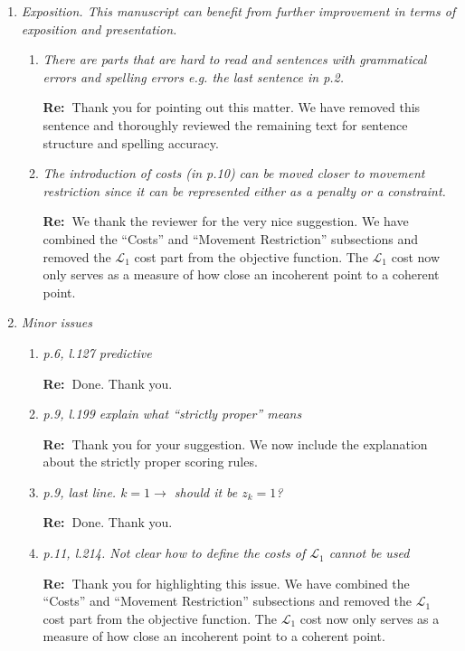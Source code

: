 \documentclass[11pt,a4paper]{article}
\newcommand{\RE}[2][Re:~]{{\color{blue}\textbf{#1}#2}}
\begin{document}
\begin{enumerate}
\item \textit{Exposition. This manuscript can benefit from further improvement in terms of exposition and presentation. }
\begin{enumerate}
    \item \textit{There are parts that are hard to read and sentences with grammatical errors and spelling errors e.g. the last sentence in p.2.}
    
    \RE{Thank you for pointing out this matter. We have removed this sentence and thoroughly reviewed the remaining text for sentence structure and spelling accuracy.}
    \item \textit{The introduction of costs (in p.10) can be moved closer to movement restriction since it can be represented either as a penalty or a constraint.}
    
    \RE{We thank the reviewer for the very nice suggestion. We have combined the ``Costs'' and ``Movement Restriction'' subsections and removed the $\mathcal{L}_1$ cost part from the objective function. The $\mathcal{L}_1$ cost now only serves as a measure of how close an incoherent point to a coherent point.}

\end{enumerate}




\item \textit{ Minor issues }

  \begin{enumerate}
    \item  \textit{p.6, l.127 predictive}

    \RE{Done. Thank you.}

    \item \textit{p.9, l.199 explain what ``strictly proper'' means}

    \RE{Thank you for your suggestion. We now include the explanation about the strictly proper scoring rules.}



    \item \textit{p.9, last line. $k = 1 \rightarrow$ should it be $z_k = 1$?}
    
    \RE{Done. Thank you.}
    \item \textit{p.11, l.214. Not clear how to define the costs of $\mathcal{L}_1$ cannot be used}
    
    \RE{Thank you for highlighting this issue. We have combined the ``Costs'' and ``Movement Restriction'' subsections and removed the $\mathcal{L}_1$ cost part from the objective function. The $\mathcal{L}_1$ cost now only serves as a measure of how close an incoherent point to a coherent point.}

  \end{enumerate}

\end{enumerate}
\newpage
\end{document}
